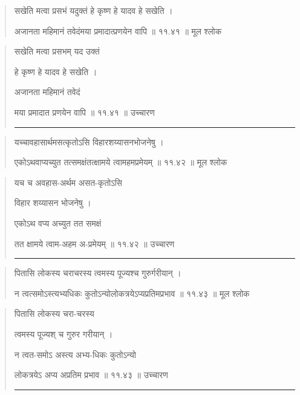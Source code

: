 \begin{quotation} 

सखेति मत्वा प्रसभं यदुक्तं हे कृष्ण हे यादव हे सखेति ।  

अजानता महिमानं तवेदंमया प्रमादात्प्रणयेन वापि  ॥ ११.४१ ॥  मूल श्लोक
\end{quotation}

\begin{quotation}

सखेति मत्वा प्रसभम् यद उक्तं 

हे कृष्ण हे यादव हे सखेति ।  

अजानता महिमानं तवेदं 

मया प्रमादात  प्रणयेन वापि  ॥ ११.४१ ॥  उच्चारण

\noindent\rule{16cm}{0.4pt} 
\end{quotation}


\begin{quotation} 

यच्चावहासार्थमसत्कृतोऽसि विहारशय्यासनभोजनेषु  ।  

एकोऽथवाप्यच्युत तत्समक्षंतत्क्षामये त्वामहमप्रमेयम्‌  ॥ ११.४२ ॥  मूल श्लोक
\end{quotation}

\begin{quotation}

यच च अवहास-अर्थम असत-कृतोऽसि 

विहार शय्यासन भोजनेषु  ।  

एकोऽथ वप्य अच्युत तत समक्षं

तत क्षामये त्वाम-अहम अ-प्रमेयम्‌  ॥ ११.४२ ॥  उच्चारण

\noindent\rule{16cm}{0.4pt} 
\end{quotation}


\begin{quotation} 

पितासि लोकस्य चराचरस्य त्वमस्य पूज्यश्च गुरुर्गरीयान्‌ ।  

न त्वत्समोऽस्त्यभ्यधिकः कुतोऽन्योलोकत्रयेऽप्यप्रतिमप्रभाव  ॥ ११.४३ ॥  मूल श्लोक
\end{quotation}

\begin{quotation}

पितासि लोकस्य चरा-चरस्य 

त्वमस्य पूज्यश् च गुरुर गरीयान्‌  ।  

न त्वत-समोऽ अस्त्य अभ्य-धिकः कुतोऽन्यो
 
लोकत्रयेऽ अप्य अप्रतिम प्रभाव  ॥ ११.४३ ॥  उच्चारण

\noindent\rule{16cm}{0.4pt} 
\end{quotation}


